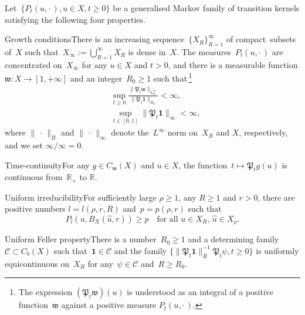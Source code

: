 \documentclass[AHL,Unicode,longabstracts]{cedram}
\newcommand{\mek}{{\mathbf 1}}
\newcommand{\R}{{\mathbb R}}
\newcommand{\CC}{{\mathcal C}}
\newcommand{\ty}{\infty}
\newcommand{\wwww}{{\mathfrak w}}
\newcommand{\PPPP}{{\mathfrak P}}
\begin{document}
\begin{theo}\label{T:5.3}
Let~$\{P_t(u,{\cdot\,}),u\in X, t\ge0\} $ be a generalised Markov family of transition kernels satisfying the following four properties.

Growth conditions\pointir There is an increasing sequence~$\{X_R\}_{R=1}^\infty$ of compact~subsets of~$X$ such that~$X_\infty:=\bigcup_{R=1}^\ty X_R$ is dense in~$X$. The measures~$P_{t}(u,{\cdot\,})$ are concentrated on~$X_\infty$ for any $u\in X$ and $t>0$, and there is a measurable function $\wwww:X\to[1,+\infty]$ and an integer~$R_0\ge1$ such that\,\footnote{The expression $(\PPPP_t\wwww)(u)$ is understood as an integral of a positive function~$\wwww$ against a positive measure $P_t(u,{\cdot\,})$.}
\begin{align*}
&\sup_{t\ge0}
\frac{\|\PPPP_t\wwww\|_{L_\wwww^\infty}}{\|\PPPP_t{\mek}\|_{R_0}}<\infty,\\
&\sup_{t\in [0,1]} \|\PPPP_t{\mek}\|_{\infty}<\ty,
\end{align*}
where $\|{\,\cdot\,}\|_R$ and $\|{\,\cdot\,}\|_\ty$ denote the~$L^\infty$ norm on~$X_R$ and $X$, respectively, and we set $\infty/\infty=0$.

Time-continuity\pointir For any $g\in C_\wwww(X)$ and $u\in X$, the function~$t\mapsto\PPPP_tg(u) $ is continuous from~$\R_+$ to $\R$.

Uniform irreducibility\pointir For sufficiently large $\rho\ge1$, any $R\ge 1$ and $r>0$, there are positive numbers $l=l(\rho,r,R)$ and~$p=p(\rho,r)$ such that
\[
P_l(u,B_{X}(\hat u,r))\ge p\quad\mbox{for all~$u\in X_R,\,\hat u\in X_\rho$}.
\]

Uniform Feller property\pointir There is a number~$R_0\ge1$ and a determining family~$\CC\subset C_b(X)$ such that~$\mek\in\CC$ and the family $\{\|\PPPP_t{\mek}\|_R^{-1}\PPPP_t\psi, t\ge0\}$ is uniformly equicontinuous on~$X_R$ for any~$\psi\in \CC$ and~$R\ge R_0$.


\end{theo}
\end{document}
